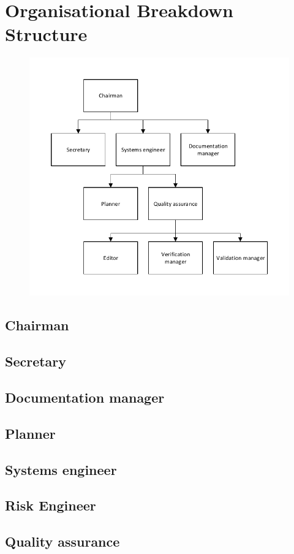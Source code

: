 \section{Organisational Breakdown Structure}\label{cha:OBS}
\begin{figure}
\includegraphics{./Figure/OBS.pdf}
\end{figure}
\subsection{Chairman}\label{par:Chairman}


\subsection{Secretary}\label{par:Secretary}


\subsection{Documentation manager}\label{par:D_and_A}


\subsection{Planner}\label{par:Planner}


\subsection{Systems engineer}\label{par:SE}


\subsection{Risk Engineer}\label{par:RiskEng}


\subsection{Quality assurance}\label{par:QA}

